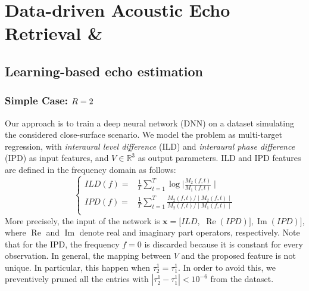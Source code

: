 \chapter{Data-driven Acoustic Echo Retrieval \& \lantern}\label{chap:lantern}

\section{Learning-based echo estimation}


\subsection{Simple Case: $R = 2$}

Our approach is to train a deep neural network (DNN) on a dataset simulating the considered close-surface scenario.
We model the problem as multi-target regression, with \textit{interaural level difference} (ILD)
and \textit{interaural phase difference} (IPD) as input features, and $V \in \mathbb{R}^3$ as output parameters.
ILD and IPD features are defined in the frequency domain as follows:
\begin{equation}
\label{eq:mirage:features}
\begin{cases}
ILD(f)  =& \tfrac{1}{T} \sum_{t=1}^T \log{\mid \frac{M_2(f,t)}{M_1(f,t)} \mid } \\
IPD(f)  =& \tfrac{1}{T} \sum_{t=1}^T \frac{M_2(f,t)/ \mid M_2(f,t) \mid }{M_2(f,t) / \mid M_1(f,t)  \mid}\\
\end{cases}
\end{equation}
More precisely, the input of the network is
$\mathbf{x} = [ILD,$ $\operatorname{Re}(IPD)], \operatorname{Im}(IPD)]$, where $\operatorname{Re}$
and $\operatorname{Im}$ denote real and imaginary part operators, respectively.
Note that for the IPD, the frequency $f=0$ is discarded because it is constant for every observation.
In general, the mapping between $V$ and the proposed feature is not unique.
In particular, this happen when $\tau_2^1 = \tau_1^1$.
In order to avoid this, we preventively pruned all the entries
with $| \tau_2^1 - \tau_1^1 | < 10^{-6}$ from the dataset.

